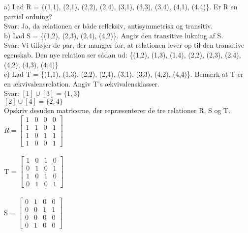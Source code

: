 \documentclass{article}
\begin{document}
a) Lad R = \{(1,1), (2,1), (2,2), (2,4), (3,1), (3,3), (3,4), (4,1), (4,4)\}. Er R en partiel ordning?
\\
\newline
Svar: Ja, da relationen er både refleksiv, antisymmetrisk og transitiv.
\\
\newline
b) Lad S = \{(1,2), (2,3), (2,4), (4,2)\}. Angiv den transitive lukning af S.
\\
\newline
Svar: Vi tilføjer de par, der mangler for, at relationen lever op til den transitive egenskab. Den nye relation ser sådan ud: \{(1,2), (1,3), (1,4), (2,2), (2,3), (2,4), (4,2), (4,3), (4,4)\}
\\
\newline
c) Lad T = \{(1,1), (1,3), (2,2), (2,4), (3,1), (3,3), (4,2), (4,4)\}. Bemærk at T er en ækvivalensrelation. Angiv T's ækvivalensklasser.
\\
\newline
Svar:
\newline
$ [1] \cup [3] = \{ 1,3 \} $
\\
\newline
$ [2]\cup[4] = \{2,4\} $
\\
\newline
Opskriv desuden matricerne, der repræsenterer de tre relationer R, S og T.
\\
\newline
\begin{math}
R =
\begin{bmatrix}
1 & 0 & 0 & 0\\
1 & 1 & 0 & 1\\
1 & 0 & 1 & 1\\
1 & 0 & 0 & 1
\end{bmatrix}
\end{math}
\\
\\
\newline
T =
\begin{math}
\begin{bmatrix}
1 & 0 & 1 & 0\\
0 & 1 & 0 & 1\\
1 & 0 & 1 & 0\\
0 & 1 & 0 & 1
\end{bmatrix}
\end{math}
\\
\\
\newline
S =
\begin{math}
\begin{bmatrix}
0 & 1 & 0 & 0\\
0 & 0 & 1 & 1\\
0 & 0 & 0 & 0\\
0 & 1 & 0 & 0
\end{bmatrix}
\end{math}
\end{document}
